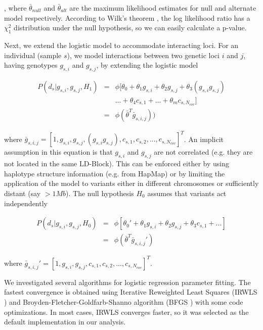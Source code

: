 , where $\bar{\theta}_{null}$ and $\bar{\theta}_{alt}$ are the maximum likelihood estimates for null and alternate model respectively. According to Wilk's theorem \cite{wilks1938large}, the log likelihood ratio has a $\chi^2_1$ distribution under the null hypothesis, so we can easily calculate a p-value.

Next, we extend the logistic model to accommodate interacting loci. For an individual (sample $s$), we model interactions between two genetic loci $i$ and $j$, having genotypes $g_{s,i}$ and $g_{s,j}$, by extending the logistic model

\begin{eqnarray} \label{eq:gwasLogRegH1}
    P( d_s | g_{s,i},g_{s,j}, H_1) & = & \phi[ \theta_0 + \theta_1 g_{s,i} + \theta_2 g_{s,j} + \theta_3 (g_{s,i} g_{s,j}) \\
    & & ... + \theta_4 c_{s,1} + ... + \theta_m c_{s,N_{cov}} ] \\
    & = & \phi( \bar{\theta}^T \bar{g}_{s,i,j}) )
\end{eqnarray}

where $\bar{g}_{s,i,j} =  [1, g_{s,i}, g_{s,j}, ( g_{s,i} g_{s,j}), c_{s,1}, c_{s,2}, ..., c_{s,N_{cov}} ]^T$. An implicit assumption in this equation is that $g_{s,i}$ and $g_{s,j}$ are not correlated (e.g. they are not located in the same LD-Block). This can be enforced either by using haplotype structure information (e.g. from HapMap) or by limiting the application of the model to variants either in different chromosomes or sufficiently distant (say $> 1Mb$). The null hypothesis $H_0$ assumes that variants act independently

\begin{eqnarray} \label{eq:gwasLogRegH0}
    P( d_s | g_{s,i},g_{s,j}, H_0) & = & \phi[ \theta_0' + \theta_1 g_{s,i} + \theta_2 g_{s,j} + \theta_3 c_{s,1} + ... ] \\
   & = & \phi( \bar{\theta}^T \bar{g}_{s,i,j}' )
\end{eqnarray}

where $\bar{g}_{s,i,j}' =  [1, g_{s,i}, g_{s,j}, c_{s,1} , c_{s,2}, ..., c_{s,N_{cov}} ]^T$.

We investigated several algorithms for logistic regression parameter fitting. The fastest convergence is obtained using Iterative Reweighted Least Squares (IRWLS \cite{daubechies2010iteratively}) and Broyden-Fletcher-Goldfarb-Shanno algorithm (BFGS \cite{broyden1970convergence}) with some code optimizations. In most cases, IRWLS converges faster, so it was selected as the default implementation in our analysis.

